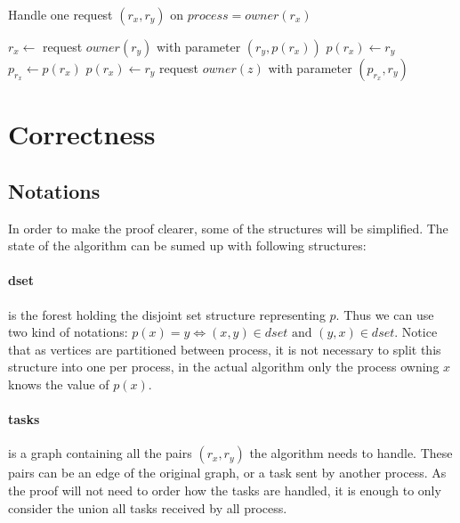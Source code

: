 \documentclass[12px]{article}
\begin{document}
    \begin{algorithm}
      \caption{Handle one request $(r_x, r_y)$ on $process = owner(r_x)$}
      \begin{algorithmic}[1]
          \State $r_x \gets$ 
          \State
            \State request $owner(r_y)$ with parameter $(r_y, p(r_x))$
              \State $p(r_x) \gets r_y$
            \Else
              \State $p_{r_x} \gets p(r_x)$
              \State $p(r_x) \gets r_y$
              \State request $owner(z)$ with parameter $(p_{r_x}, r_y)$
            \EndIf
          \EndIf
        \EndFunction
      \end{algorithmic}
      \label{algo:handle_task}
    \end{algorithm}


  \section{Correctness}

  \subsection{Notations}
    In order to make the proof clearer, some of the structures will be simplified. The state of the algorithm can be sumed up with following structures:

    \paragraph{dset} is the forest holding the disjoint set structure representing $p$. Thus we can use two kind of notations: $p(x) = y \Leftrightarrow (x, y) \in dset \text{ and } (y, x) \in dset$. Notice that as vertices are partitioned between process, it is not necessary to split this structure into one per process, in the actual algorithm only the process owning $x$ knows the value of $p(x)$.

    \paragraph{tasks} is a graph containing all the pairs $(r_x, r_y)$ the algorithm needs to handle. These pairs can be an edge of the original graph, or a task sent by another process. As the proof will not need to order how the tasks are handled, it is enough to only consider the union all tasks received by all process.
\end{document}
